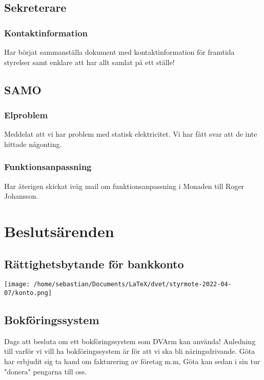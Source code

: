 \documentclass[protokoll]{dvd}
\begin{document}
\subsection{Sekreterare}

\subsubsection{Kontaktinformation}
Har börjat sammanställa dokument med kontaktinformation för framtida styrelser samt enklare att har allt samlat på ett ställe!

\subsection{SAMO}

\subsubsection{Elproblem}
Meddelat att vi har problem med statisk elektricitet. Vi har fått svar att de inte hittade någonting.

\subsubsection{Funktionsanpassning}
Har återigen skickat iväg mail om funktionsanpassning i Monaden till Roger Johansson.

\newpage

\section{Beslutsärenden}

\subsection{Rättighetsbytande för bankkonto}

\texttt{[image: /home/sebastian/Documents/LaTeX/dvet/styrmote-2022-04-07/konto.png]}

\subsection{Bokföringssystem}
Dags att besluta om ett bokföringssystem som DVArm kan använda!
Anledning till varför vi vill ha bokföringssystem är för att vi ska bli näringsdrivande.
Göta har erbjudit sig ta hand om fakturering av företag m.m, Göta kan sedan i sin tur "donera" pengarna till oss.
\end{document}
